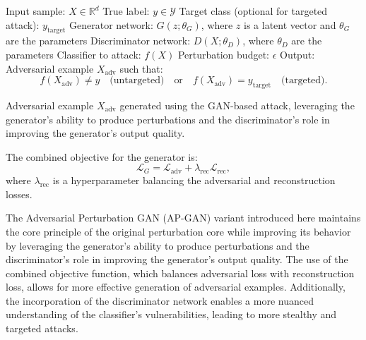Input sample: $X \in \mathbb{R}^d$
True label: $y \in \mathcal{Y}$
Target class (optional for targeted attack): $y_{\text{target}}$
Generator network: $G(z; \theta_G)$, where $z$ is a latent vector and $\theta_G$ are the parameters
Discriminator network: $D(X; \theta_D)$, where $\theta_D$ are the parameters
Classifier to attack: $f(X)$
Perturbation budget: $\epsilon$
Output: Adversarial example $X_{\text{adv}}$ such that:
\[
f(X_{\text{adv}}) \neq y \quad \text{(untargeted)} \quad \text{or} \quad f(X_{\text{adv}}) = y_{\text{target}} \quad \text{(targeted)}.
\]

Adversarial example $X_{\text{adv}}$ generated using the GAN-based attack, leveraging the generator's ability to produce perturbations and the discriminator's role in improving the generator's output quality.

The combined objective for the generator is:
\[
\mathcal{L}_G = \mathcal{L}_{\text{adv}} + \lambda_{\text{rec}} \mathcal{L}_{\text{rec}},
\]
where $\lambda_{\text{rec}}$ is a hyperparameter balancing the adversarial and reconstruction losses.

The Adversarial Perturbation GAN (AP-GAN) variant introduced here maintains the core principle of the original perturbation core while improving its behavior by leveraging the generator's ability to produce perturbations and the discriminator's role in improving the generator's output quality. The use of the combined objective function, which balances adversarial loss with reconstruction loss, allows for more effective generation of adversarial examples. Additionally, the incorporation of the discriminator network enables a more nuanced understanding of the classifier's vulnerabilities, leading to more stealthy and targeted attacks.